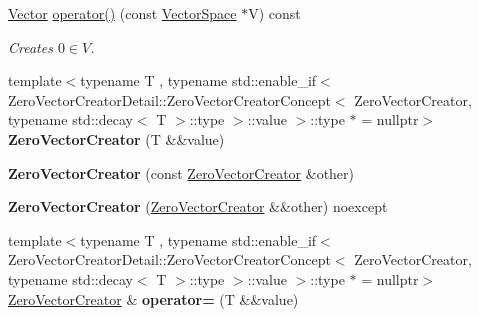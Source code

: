\begin{DoxyCompactItemize}
\item 
\hyperlink{classSpacy_1_1Vector}{Vector} \hyperlink{classSpacy_1_1ZeroVectorCreator_afb20329c56ee527505ef7390eba96870}{operator()} (const \hyperlink{classSpacy_1_1VectorSpace}{Vector\+Space} $\ast$V) const \hypertarget{classSpacy_1_1ZeroVectorCreator_afb20329c56ee527505ef7390eba96870}{}\label{classSpacy_1_1ZeroVectorCreator_afb20329c56ee527505ef7390eba96870}

\begin{DoxyCompactList}\small\item\em Creates $ 0 \in V $. \end{DoxyCompactList}\item 
{\footnotesize template$<$typename T , typename std\+::enable\+\_\+if$<$ Zero\+Vector\+Creator\+Detail\+::\+Zero\+Vector\+Creator\+Concept$<$ Zero\+Vector\+Creator, typename std\+::decay$<$ T $>$\+::type $>$\+::value $>$\+::type $\ast$  = nullptr$>$ }\\{\bfseries Zero\+Vector\+Creator} (T \&\&value)\hypertarget{classSpacy_1_1ZeroVectorCreator_aa33a8160098d48aa6034497665eaa084}{}\label{classSpacy_1_1ZeroVectorCreator_aa33a8160098d48aa6034497665eaa084}

\item 
{\bfseries Zero\+Vector\+Creator} (const \hyperlink{classSpacy_1_1ZeroVectorCreator}{Zero\+Vector\+Creator} \&other)\hypertarget{classSpacy_1_1ZeroVectorCreator_a30ae2c5e792fe3f45cbd02aa5068666a}{}\label{classSpacy_1_1ZeroVectorCreator_a30ae2c5e792fe3f45cbd02aa5068666a}

\item 
{\bfseries Zero\+Vector\+Creator} (\hyperlink{classSpacy_1_1ZeroVectorCreator}{Zero\+Vector\+Creator} \&\&other) noexcept\hypertarget{classSpacy_1_1ZeroVectorCreator_ad0476e84d16f8eef1e6b55261ef77541}{}\label{classSpacy_1_1ZeroVectorCreator_ad0476e84d16f8eef1e6b55261ef77541}

\item 
{\footnotesize template$<$typename T , typename std\+::enable\+\_\+if$<$ Zero\+Vector\+Creator\+Detail\+::\+Zero\+Vector\+Creator\+Concept$<$ Zero\+Vector\+Creator, typename std\+::decay$<$ T $>$\+::type $>$\+::value $>$\+::type $\ast$  = nullptr$>$ }\\\hyperlink{classSpacy_1_1ZeroVectorCreator}{Zero\+Vector\+Creator} \& {\bfseries operator=} (T \&\&value)\hypertarget{classSpacy_1_1ZeroVectorCreator_a6bf1e05757880d3fdd6a1c481237d0a1}{}\label{classSpacy_1_1ZeroVectorCreator_a6bf1e05757880d3fdd6a1c481237d0a1}


\end{DoxyCompactItemize}
